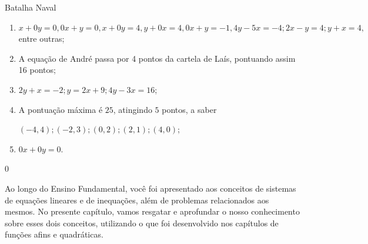 \begin{answer}{Batalha Naval}
{
\begin{enumerate}
\item $x+0y=0, 0x+y=0, x+0y=4, y+0x=4, 0x+y=-1, 4y-5x=-4; 2x-y=4; y+x=4,$ entre outras;
\item A equação de André passa por 4 pontos da cartela de Laís,  pontuando assim 16 pontos;
\item $2y+x=-2; y=2x+9; 4y-3x=16$;
\item A pontuação máxima é $25$, atingindo $5$ pontos, a saber 

$(-4,4); (-2,3); (0,2); (2,1); (4,0)$;
\item $0x+0y=0$.
\end{enumerate}
}{0}
\end{answer}

\label{\detokenize{AF107-1:explorando-taxa-de-variacao-media}}\label{\detokenize{AF107-1::doc}}

Ao longo do Ensino Fundamental, você foi apresentado aos conceitos de sistemas de equações lineares e de inequações, além de problemas relacionados aos mesmos. No presente capítulo, vamos resgatar e aprofundar o nosso conhecimento sobre esses dois conceitos, utilizando o que foi desenvolvido nos capítulos de funções afins e quadráticas.  


